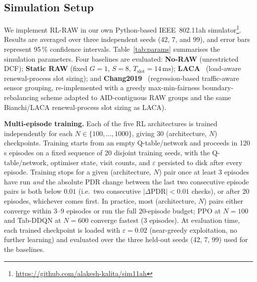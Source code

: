 \documentclass[conference]{IEEEtran}
\begin{document}
\subsection{Simulation Setup}
\label{sec:setup}

We implement RL-RAW in our own Python-based IEEE~802.11ah simulator\footnote{
\url{https://github.com/alakesh-kalita/sim11ah}}.
Results are averaged over three independent seeds (42, 7, and 99), and error
bars represent 95\,\% confidence intervals.
Table~\ref{tab:params} summarises the simulation parameters.
Four baselines are evaluated: \textbf{No-RAW} (unrestricted DCF);
\textbf{Static RAW} (fixed $G=1$, $S=8$, $T_\text{slot}=14\,\text{ms}$);
\textbf{LACA}~\cite{taramit2023laca} (load-aware renewal-process slot sizing);
and \textbf{Chang2019}~\cite{chang2019traffic} (regression-based
traffic-aware sensor grouping, re-implemented with a greedy max-min-fairness
boundary-rebalancing scheme adapted to AID-contiguous RAW groups and the
same Bianchi/LACA renewal-process slot sizing as LACA).

\textbf{Multi-episode training.}
Each of the five RL architectures is trained independently for each
$N \in \{100,\ldots,1000\}$, giving 30 (architecture, $N$) checkpoints.
Training starts from an empty Q-table/network and proceeds in 120\,s
episodes on a fixed sequence of 20 disjoint training seeds, with the
Q-table/network, optimiser state, visit counts, and $\varepsilon$ persisted
to disk after every episode.
Training stops for a given (architecture, $N$) pair once at least 3 episodes
have run \emph{and} the absolute PDR change between the last two consecutive
episode pairs is both below $0.01$ (i.e.\ two consecutive
$|\Delta\text{PDR}|<0.01$ checks), or after 20 episodes, whichever comes
first.
In practice, most (architecture, $N$) pairs either converge within
3--9 episodes or run the full 20-episode budget; PPO at $N=100$ and
Tab-DDQN at $N=600$ converge fastest (3 episodes).
At evaluation time, each trained checkpoint is loaded with
$\varepsilon = 0.02$ (near-greedy exploitation, no further learning) and
evaluated over the three held-out seeds (42, 7, 99) used for the baselines.
\end{document}
